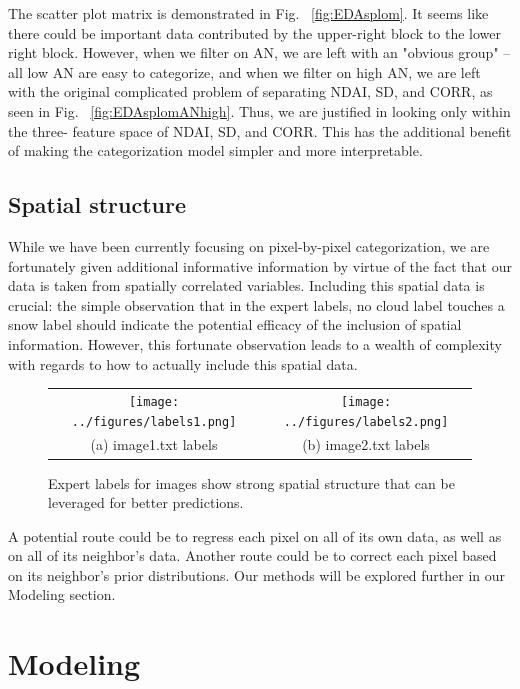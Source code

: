 \documentclass[english]{article}\usepackage{graphicx, color}
\numberwithin{equation}{section}
\numberwithin{figure}{section}
\begin{document}
The scatter plot matrix is demonstrated in Fig. ~\ref{fig:EDAsplom}. It seems 
like there could be important data contributed by the upper-right block to the 
lower right block.  However, when we filter on AN, we are left with an "obvious 
group" -- all low AN are easy to categorize, and when we filter on high AN, we 
are left with the original complicated problem of separating NDAI, SD, and CORR, 
as seen in Fig. ~\ref{fig:EDAsplomANhigh}. Thus, we are justified in looking 
only within the three- feature space of NDAI, SD, and CORR. This has the 
additional benefit of making the categorization model simpler and more interpretable.

\subsection{Spatial structure}
While we have been currently focusing on pixel-by-pixel categorization, we are
fortunately given additional informative information by virtue of the fact that our
data is taken from spatially correlated variables. Including this spatial data is
crucial: the simple observation that in the expert labels, no cloud label touches
a snow label should indicate the potential efficacy of the inclusion of spatial
information. However, this fortunate observation leads to a wealth of complexity
with regards to how to actually include this spatial data.


\begin{figure}[!h]
\begin{tabular}{cc}
  \texttt{[image: ../figures/labels1.png]} &
  \texttt{[image: ../figures/labels2.png]}  \\
  (a) image1.txt labels & (b) image2.txt labels
\end{tabular}
\caption{Expert labels for images show strong spatial structure that can be 
	leveraged for better predictions.}
\end{figure}


A potential route could be to regress each pixel on all of its own data, as well as
on all of its neighbor's data. Another route could be to correct each pixel based
on its neighbor's prior distributions. Our methods will be explored further in our
Modeling section.



\section{Modeling}
\end{document}
